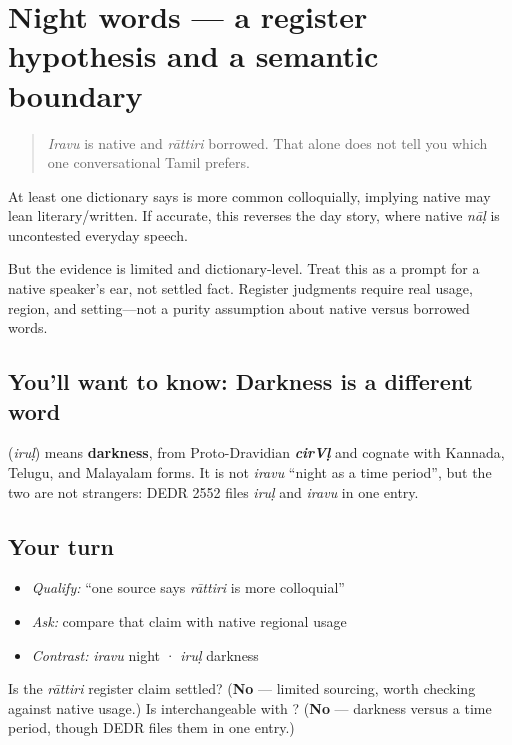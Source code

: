 \section[\texorpdfstring{\ta{இரவு} / \ta{ராத்திரி} … (iravu / rāttiri …)}{இரவு / ராத்திரி … (iravu / rāttiri …)}]{Night words — a register hypothesis and a semantic boundary}

\label{lesson:TA-C24-night-register-darkness}



\begin{quote}
\emph{Iravu} is native and \emph{rāttiri} borrowed. That alone does not tell you which one conversational Tamil prefers.
\end{quote}

\begin{culture}
At least one dictionary says \textbf{} is more common colloquially, implying native \textbf{} may lean literary/written. If accurate, this reverses the day story, where native \emph{nāḷ} is uncontested everyday speech.

But the evidence is limited and dictionary-level. Treat this as a prompt for a native speaker's ear, not settled fact. Register judgments require real usage, region, and setting—not a purity assumption about native versus borrowed words.
\end{culture}

\subsection*{You'll want to know: Darkness is a different word}
\textbf{} (\emph{iruḷ}) means \textbf{darkness}, from Proto-Dravidian \emph{\textbf{cirVḷ}} and cognate with Kannada, Telugu, and Malayalam forms. It is not \emph{iravu} \textquotedblleft{}night as a time period\textquotedblright{}, but the two are not strangers: DEDR 2552 files \emph{iruḷ} and \emph{iravu} in one entry.

\subsection*{Your turn}
\begin{itemize}
\raggedright
  \item \emph{Qualify:} \textquotedblleft{}one source says \emph{rāttiri} is more colloquial\textquotedblright{}
  \item \emph{Ask:} compare that claim with native regional usage
  \item \emph{Contrast:} \emph{iravu} night · \emph{iruḷ} darkness
\end{itemize}

\begin{tcolorbox}[breakable,colback=teal!4,colframe=teal!35!black,title={Before you move on}]
Is the \emph{rāttiri} register claim settled? (\textbf{No} — limited sourcing, worth checking against native usage.) Is \textbf{} interchangeable with \textbf{}? (\textbf{No} — darkness versus a time period, though DEDR files them in one entry.)
\end{tcolorbox}
